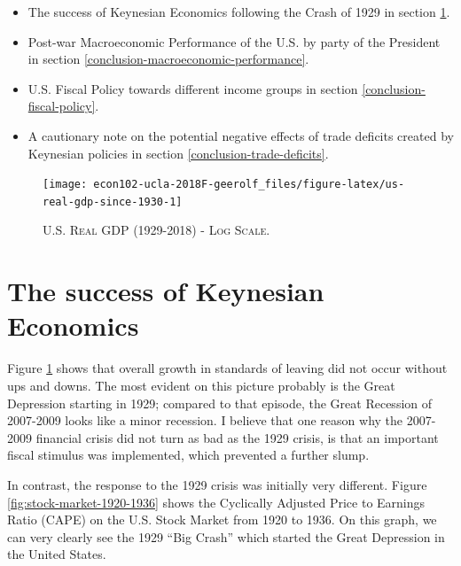 \documentclass[]{book}
\providecommand{\tightlist}{%
  \setlength{\itemsep}{0pt}\setlength{\parskip}{0pt}}
\begin{document}
\begin{itemize}
\tightlist
\item
  The success of Keynesian Economics following the Crash of 1929 in
  section \ref{conclusion-birth-keynesian}.
\item
  Post-war Macroeconomic Performance of the U.S. by party of the
  President in section \ref{conclusion-macroeconomic-performance}.
\item
  U.S. Fiscal Policy towards different income groups in section
  \ref{conclusion-fiscal-policy}.
\item
  A cautionary note on the potential negative effects of trade deficits
  created by Keynesian policies in section
  \ref{conclusion-trade-deficits}.
\end{itemize}




\begin{figure}

{\centering \texttt{[image: econ102-ucla-2018F-geerolf\_files/figure-latex/us-real-gdp-since-1930-1]} 

}

\caption{\textsc{U.S. Real GDP (1929-2018) - Log
Scale}.}\label{fig:us-real-gdp-since-1930}
\end{figure}

\section{The success of Keynesian
Economics}\label{conclusion-birth-keynesian}

Figure \ref{fig:us-real-gdp-since-1930} shows that overall growth in
standards of leaving did not occur without ups and downs. The most
evident on this picture probably is the Great Depression starting in
1929; compared to that episode, the Great Recession of 2007-2009 looks
like a minor recession. I believe that one reason why the 2007-2009
financial crisis did not turn as bad as the 1929 crisis, is that an
important fiscal stimulus was implemented, which prevented a further
slump.

In contrast, the response to the 1929 crisis was initially very
different. Figure \ref{fig:stock-market-1920-1936} shows the Cyclically
Adjusted Price to Earnings Ratio (CAPE) on the U.S. Stock Market from
1920 to 1936. On this graph, we can very clearly see the 1929 ``Big
Crash'' which started the Great Depression in the United States.
\end{document}
